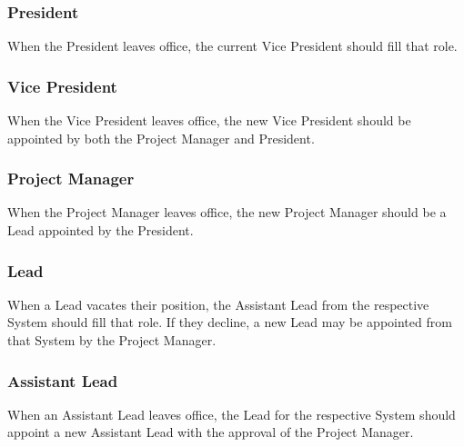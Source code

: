 \subsubsection{President}
\label{impeachment:succession:president}

When the President leaves office, the current Vice President should fill that role.

\subsubsection{Vice President}
\label{impeachment:succession:vice}

When the Vice President leaves office, the new Vice President should be appointed by both the Project Manager and President.

\subsubsection{Project Manager}
\label{impeachment:succession:pm}

When the Project Manager leaves office, the new Project Manager should be a Lead appointed by the President.

\subsubsection{Lead}
\label{impeachment:succession:lead}

When a Lead vacates their position, the Assistant Lead from the respective System should fill that role. If they decline, a new Lead may be appointed from that System by the Project Manager.

\subsubsection{Assistant Lead}
\label{impeachment:succession:assistant}

When an Assistant Lead leaves office, the Lead for the respective System should appoint a new Assistant Lead with the approval of the Project Manager.